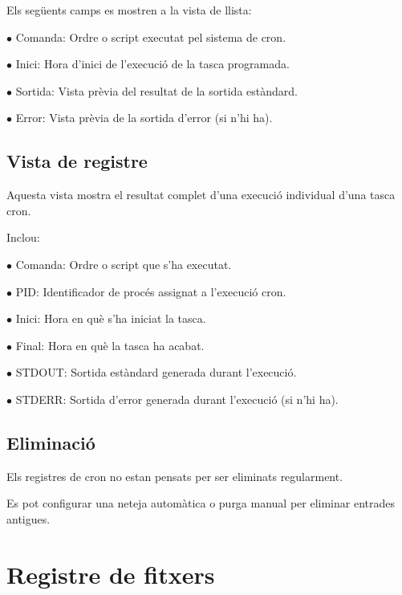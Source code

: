\documentclass[a4paper]{article}
\begin{document}
Els següents camps es mostren a la vista de llista:

\begin{compactitem}
\item[\color{myblue}$\bullet$] Comanda: Ordre o script executat pel sistema de cron.
\item[\color{myblue}$\bullet$] Inici: Hora d'inici de l'execució de la tasca programada.
\item[\color{myblue}$\bullet$] Sortida: Vista prèvia del resultat de la sortida estàndard.
\item[\color{myblue}$\bullet$] Error: Vista prèvia de la sortida d'error (si n'hi ha).
\end{compactitem}

\hypertarget{toc14}{}
\subsection{Vista de registre}

Aquesta vista mostra el resultat complet d'una execució individual d'una tasca cron.

Inclou:

\begin{compactitem}
\item[\color{myblue}$\bullet$] Comanda: Ordre o script que s'ha executat.
\item[\color{myblue}$\bullet$] PID: Identificador de procés assignat a l'execució cron.
\item[\color{myblue}$\bullet$] Inici: Hora en què s'ha iniciat la tasca.
\item[\color{myblue}$\bullet$] Final: Hora en què la tasca ha acabat.
\item[\color{myblue}$\bullet$] STDOUT: Sortida estàndard generada durant l'execució.
\item[\color{myblue}$\bullet$] STDERR: Sortida d'error generada durant l'execució (si n'hi ha).
\end{compactitem}

\hypertarget{toc15}{}
\subsection{Eliminació}

Els registres de cron no estan pensats per ser eliminats regularment.

Es pot configurar una neteja automàtica o purga manual per eliminar entrades antigues.


\hypertarget{toc16}{}
\section{Registre de fitxers}
\end{document}
